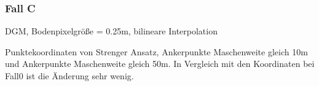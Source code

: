 \documentclass[12pt]{article}
\begin{document}
\subsubsection{Fall C}
DGM, Bodenpixelgröße = 0.25m, bilineare Interpolation
\begin{figure}[ht]\centering
\end{figure}
\newline
Punktekoordinaten von Strenger Ansatz, Ankerpunkte Maschenweite gleich 10m und Ankerpunkte Maschenweite gleich 50m. In Vergleich mit den Koordinaten bei Fall0 ist die Änderung sehr wenig. 
\end{document}
